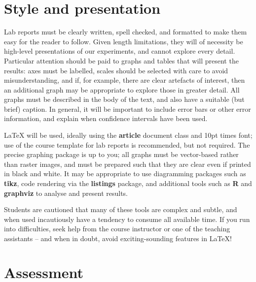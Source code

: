 \documentclass[a4paper,10pt]{article}
\begin{document}
\section*{Style and presentation}

Lab reports must be clearly written, spell checked, and formatted to make them
easy for the reader to follow.
Given length limitations, they will of necessity be high-level presentations
of our experiments, and cannot explore every detail.
Particular attention should be paid to graphs and tables that will present the
results: axes must be labelled, scales should be selected with care to avoid
misunderstanding, and if, for example, there are clear artefacts of interest,
then an additional graph may be appropriate to explore those in greater
detail.
All graphs must be described in the body of the text, and also have a
suitable (but brief) caption.
In general, it will be important to include error bars or other error
information, and explain when confidence intervals have been used.

LaTeX will be used, ideally using the \textbf{article} document class and 10pt
times font; use of the course template for lab reports is recommended, but not
required.
The precise graphing package is up to you; all graphs must be vector-based
rather than raster images, and must be prepared such that they are clear even
if printed in black and white.
It may be appropriate to use diagramming packages such as \textbf{tikz}, code
rendering via the \textbf{listings} package,  and additional tools such as
\textbf{R} and \textbf{graphviz} to analyse and present results.

Students are cautioned that many of these tools are complex and subtle, and
when used incautiously have a tendency to consume all available time.
If you run into difficulties, seek help from the course instructor or one of
the teaching assistants -- and when in doubt, avoid exciting-sounding features
in LaTeX!

\section*{Assessment}
\end{document}
